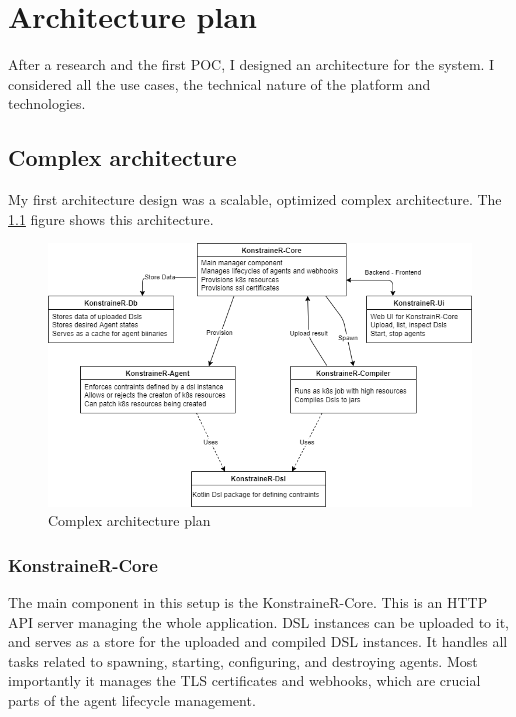 \setlength{\parindent}{0pt}
\setlength{\parskip}{0.6em}

\chapter{Architecture plan}
\label{sec:archPlan}

After a research and the first POC, I designed an architecture for the system. I considered all the use cases, the technical nature of the platform and technologies.

\section{Complex architecture}

My first architecture design was a scalable, optimized complex architecture. The \ref{fig:comp_arch} figure shows this architecture.

\begin{figure}[h]
    \centering
    \includegraphics[width=130mm, keepaspectratio]{content_real/25_archPlan/xarch.png}
    \caption{Complex architecture plan}
    \label{fig:comp_arch}
\end{figure}

\subsection{KonstraineR-Core}

The main component in this setup is the KonstraineR-Core. This is an HTTP API server managing the whole application. DSL instances can be uploaded to it, and serves as a store for the uploaded and compiled DSL instances. It handles all tasks related to spawning, starting, configuring, and destroying agents. Most importantly it manages the TLS certificates and webhooks, which are crucial parts of the agent lifecycle management.

